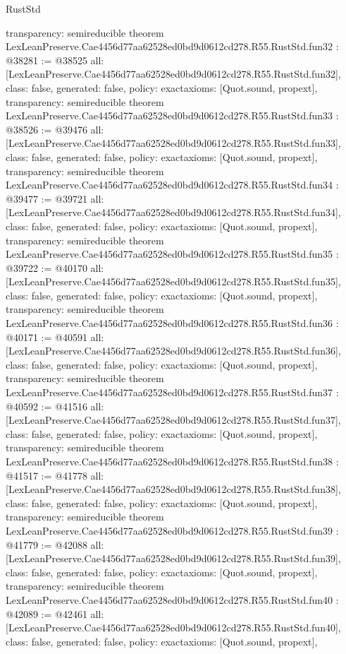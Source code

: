 \begin{lexlean}{RustStd}
\begin{coremodule}
{  transparency: semireducible
}
theorem LexLeanPreserve.Cae4456d77aa62528ed0bd9d0612cd278.R55.RustStd.fun32 : @38281 := @38525 {
  all: [LexLeanPreserve.Cae4456d77aa62528ed0bd9d0612cd278.R55.RustStd.fun32],
  class: false,
  generated: false,
  policy: exact{axioms: [Quot.sound, propext]},
  transparency: semireducible
}
theorem LexLeanPreserve.Cae4456d77aa62528ed0bd9d0612cd278.R55.RustStd.fun33 : @38526 := @39476 {
  all: [LexLeanPreserve.Cae4456d77aa62528ed0bd9d0612cd278.R55.RustStd.fun33],
  class: false,
  generated: false,
  policy: exact{axioms: [Quot.sound, propext]},
  transparency: semireducible
}
theorem LexLeanPreserve.Cae4456d77aa62528ed0bd9d0612cd278.R55.RustStd.fun34 : @39477 := @39721 {
  all: [LexLeanPreserve.Cae4456d77aa62528ed0bd9d0612cd278.R55.RustStd.fun34],
  class: false,
  generated: false,
  policy: exact{axioms: [Quot.sound, propext]},
  transparency: semireducible
}
theorem LexLeanPreserve.Cae4456d77aa62528ed0bd9d0612cd278.R55.RustStd.fun35 : @39722 := @40170 {
  all: [LexLeanPreserve.Cae4456d77aa62528ed0bd9d0612cd278.R55.RustStd.fun35],
  class: false,
  generated: false,
  policy: exact{axioms: [Quot.sound, propext]},
  transparency: semireducible
}
theorem LexLeanPreserve.Cae4456d77aa62528ed0bd9d0612cd278.R55.RustStd.fun36 : @40171 := @40591 {
  all: [LexLeanPreserve.Cae4456d77aa62528ed0bd9d0612cd278.R55.RustStd.fun36],
  class: false,
  generated: false,
  policy: exact{axioms: [Quot.sound, propext]},
  transparency: semireducible
}
theorem LexLeanPreserve.Cae4456d77aa62528ed0bd9d0612cd278.R55.RustStd.fun37 : @40592 := @41516 {
  all: [LexLeanPreserve.Cae4456d77aa62528ed0bd9d0612cd278.R55.RustStd.fun37],
  class: false,
  generated: false,
  policy: exact{axioms: [Quot.sound, propext]},
  transparency: semireducible
}
theorem LexLeanPreserve.Cae4456d77aa62528ed0bd9d0612cd278.R55.RustStd.fun38 : @41517 := @41778 {
  all: [LexLeanPreserve.Cae4456d77aa62528ed0bd9d0612cd278.R55.RustStd.fun38],
  class: false,
  generated: false,
  policy: exact{axioms: [Quot.sound, propext]},
  transparency: semireducible
}
theorem LexLeanPreserve.Cae4456d77aa62528ed0bd9d0612cd278.R55.RustStd.fun39 : @41779 := @42088 {
  all: [LexLeanPreserve.Cae4456d77aa62528ed0bd9d0612cd278.R55.RustStd.fun39],
  class: false,
  generated: false,
  policy: exact{axioms: [Quot.sound, propext]},
  transparency: semireducible
}
theorem LexLeanPreserve.Cae4456d77aa62528ed0bd9d0612cd278.R55.RustStd.fun40 : @42089 := @42461 {
  all: [LexLeanPreserve.Cae4456d77aa62528ed0bd9d0612cd278.R55.RustStd.fun40],
  class: false,
  generated: false,
  policy: exact{axioms: [Quot.sound, propext]},
}
\end{coremodule}
\end{lexlean}
